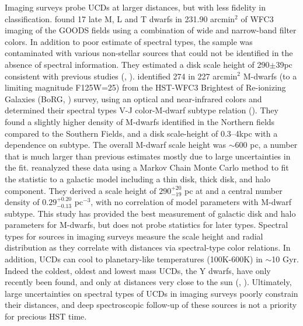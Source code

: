 \documentclass[manuscript]{aastex}
\begin{document}
Imaging surveys probe UCDs at larger distances, but with less fidelity in classification. \cite{Ryan2011} found 17 late M, L and T dwarfs in 231.90 arcmin$^2$ of  WFC3 imaging of the GOODS fields using a combination of wide and narrow-band filter colors. In addition to poor estimate of spectral types, the sample was contaminated with various non-stellar sources that could not be identified in the absence of spectral information. They estimated a disk scale height of 290$\pm$39pc consistent with previous studies (\citealt{2005ApJ...631L.159R}, \citealt{2005ApJ...622..319P}). \cite{Holwerda2014} identified  274 in 227 arcmin$^2$ M-dwarfs (to a limiting magnitude F125W=25) from the HST-WFC3 Brightest of Re-ionizing Galaxies (BoRG, \citealt{2009ApJ...695.1591P}) survey, using an optical and near-infrared colors and determined their spectral types  V-J color-M-dwarf subtype relation (\citealt{2009ApJ...695.1591P}). They found a slightly higher density of M-dwarfs identified in the Northern fields compared to the Southern Fields, and a  disk scale-height of 0.3--4kpc with a dependence on subtype. The overall M-dwarf scale height was $\sim$600 pc, a number that is much larger than previous estimates mostly due to large uncertainties in the fit. \cite{Vledder2016} reanalyzed these data using a Markov Chain Monte Carlo method to fit the statistic to a galactic model including a thin disk, thick disk, and halo component. They derived a scale height of $290^{+20}_{-19}$ pc at and a  central number density of  $0.29^{+0.20}_{-0.13}$ pc$^{-3}$, with no correlation of model parameters with M-dwarf subtype. This study has provided the best measurement of galactic disk and halo parameters for M-dwarfs, but does not probe statistics for later types. Spectral types for sources in imaging surveys measure the scale height and radial distribution as they correlate with distances via spectral-type color relations. In addition, UCDs can cool to planetary-like temperatures (100K-600K) in $\sim$10 Gyr. Indeed the coldest, oldest and lowest mass UCDs, the Y dwarfs, have only recently been found, and only at distances very close to the sun (\citealt{2011ApJ...743...50C}, \citealt{2017ApJ...842..118L}). Ultimately, large uncertainties on spectral types  of UCDs in imaging surveys poorly constrain their distances, and deep spectroscopic follow-up of these sources is not a priority for precious HST time.
\end{document}
